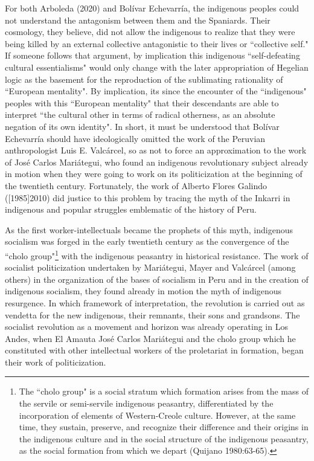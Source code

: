 \documentclass[]{interact}
\theoremstyle{plain}%
\theoremstyle{definition}
\theoremstyle{remark}
\begin{document}
For both Arboleda (2020) and Bolívar Echevarría, the indigenous peoples could not understand the antagonism between them and the Spaniards. Their cosmology, they believe, did not allow the indigenous to realize that they were being killed by an external collective antagonistic to their lives or “collective self." If someone follows that argument, by implication this indigenous “self-defeating cultural essentialisms" would only change with the later appropriation of Hegelian logic as the basement for the reproduction of the sublimating rationality of “European mentality". By implication, its since the encounter of the “indigenous" peoples with this “European mentality" that their descendants are able to interpret “the cultural other in terms of radical otherness, as an absolute negation of its own identity". In short, it must be understood that Bolívar Echevarría should have ideologically omitted the work of the Peruvian anthropologist Luis E. Valcárcel, so as not to force an approximation to the work of José Carlos Mariátegui, who found an indigenous revolutionary subject already in motion when they were going to work on its politicization at the beginning of the twentieth century. Fortunately, the work of Alberto Flores Galindo ([1985]2010) did justice to this problem by tracing the myth of the Inkarri in indigenous and popular struggles emblematic of the history of Peru. 

As the first worker-intellectuals became the prophets of this myth, indigenous socialism was forged in the early twentieth century as the convergence of the “cholo group"\footnote{The “cholo group" is a social stratum which formation arises from the mass of the servile or semi-servile indigenous peasantry, differentiated by the incorporation of elements of Western-Creole culture. However, at the same time, they sustain, preserve, and recognize their difference and their origins in the indigenous culture and in the social structure of the indigenous peasantry, as the social formation from which we depart (Quijano 1980:63-65).} with the indigenous peasantry in historical resistance. The work of socialist politicization undertaken by Mariátegui, Mayer and Valcárcel (among others) in the organization of the bases of socialism in Peru and in the creation of indigenous socialism, they found already in motion the myth of indigenous resurgence. In which framework of interpretation, the revolution is carried out as vendetta for the new indigenous, their remnants, their sons and grandsons. The socialist revolution as a movement and horizon was already operating in Los Andes, when El Amauta José Carlos Mariátegui and the cholo group which he constituted with other intellectual workers of the proletariat in formation, began their work of politicization. 
\end{document}

